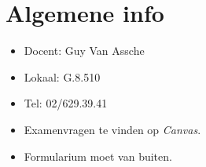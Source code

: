 \documentclass[12pt]{article}
\begin{document}
    \maketitle

    \section{Algemene info}%
    \label{sec:Algemene_info}
    \begin{itemize}
    	\item Docent: Guy Van Assche
		\item Lokaal: G.8.510
		\item Tel: 02/629.39.41
		\item Examenvragen te vinden op \emph{Canvas}.
		\item Formularium moet van buiten.
    \end{itemize}
\end{document}

